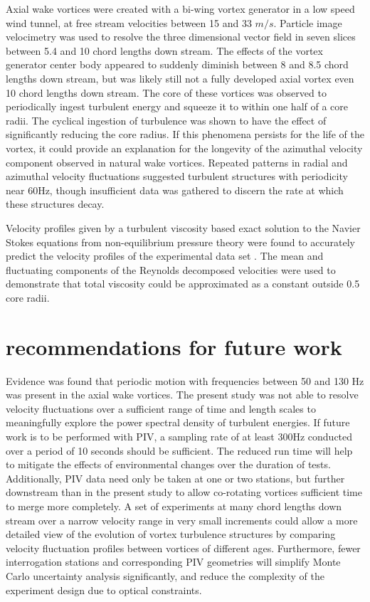 
Axial wake vortices were created with a bi-wing vortex generator in a low speed 
wind tunnel, at free stream velocities between 15 and 33 $m/s$. Particle image 
velocimetry was used to resolve the three dimensional vector field in seven 
slices between 5.4 and 10 chord lengths down stream. The effects of the vortex 
generator center body appeared to suddenly diminish between 8 and 8.5 chord 
lengths down stream, but was likely still not a fully developed axial vortex 
even 10 chord lengths down stream. 
The core of these 
vortices was observed to periodically ingest turbulent energy and squeeze it to 
within one half of a core radii. The cyclical ingestion of turbulence was shown 
to have the effect of significantly reducing the core radius. If this phenomena 
persists for the life of the vortex, it could provide an explanation for the 
longevity of the azimuthal velocity component observed in natural wake 
vortices. Repeated patterns in radial and azimuthal velocity fluctuations 
suggested turbulent structures with periodicity near 60Hz, though insufficient 
data was gathered to discern the rate at which these structures decay.

Velocity profiles given by a turbulent viscosity based exact solution to the 
Navier Stokes equations
from non-equilibrium pressure theory were found to accurately predict 
the velocity profiles of the experimental data set \cite{ash2011}. The mean and 
fluctuating components of the Reynolds decomposed velocities were used to 
demonstrate that total viscosity could be approximated as a constant 
outside 0.5 core radii. 

\newpage
\section{recommendations for future work}
Evidence was found that periodic motion with frequencies between 50 and 130 Hz 
was present in the axial wake vortices. The present study was not able to 
resolve velocity fluctuations over a sufficient range of time and length scales 
to meaningfully explore the power spectral density of turbulent energies. If 
future work is to be performed with PIV, a sampling rate of at least 300Hz 
conducted over a period of 10 seconds should be sufficient. The reduced run 
time will help to mitigate the effects of environmental changes over the 
duration of tests. Additionally, PIV 
data need only be taken at one or two stations, but further downstream than in 
the present study to allow co-rotating vortices sufficient time to merge more 
completely. A set of experiments at many chord lengths down stream over a 
narrow 
velocity range in very small increments could allow a 
more detailed view of the evolution of vortex turbulence structures by 
comparing velocity fluctuation profiles between vortices of different ages. 
Furthermore, fewer interrogation stations and corresponding PIV geometries will 
simplify Monte Carlo uncertainty analysis significantly, and reduce the 
complexity of the experiment design due to optical constraints.

